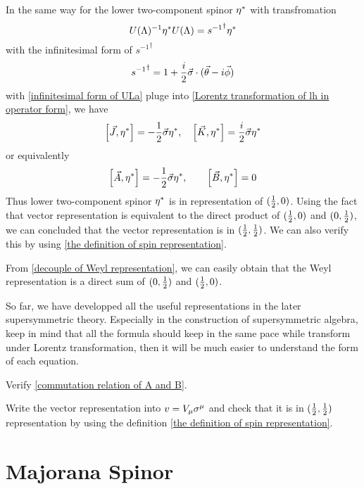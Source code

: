 In the same way for the lower two-component spinor ${\eta^*}$ with transfromation
\begin{equation} \label{Lorentz transformation of lh in operator form}
U(\Lambda)^{-1}{\eta^*} U(\Lambda) = {s^{-1}}^{\dagger} {\eta^*}
\end{equation}
with the infinitesimal form of ${s^{-1}}^{\dagger}$
\begin{equation}
  {s^{-1}}^{\dagger} = 1 + \frac{i}{2}\vec{\sigma}\cdot(\vec{\theta}-i\vec{\phi})
\end{equation}
with \eqref{infinitesimal form of ULa} pluge into \eqref{Lorentz transformation of lh in operator form}, we have
\begin{equation}
  \comm{\vec{J}}{\lh}=-\half\vec{\s}\lh,\quad
\comm{\vec{K}}{\lh} = \frac{i}{2}\vec{\s}\lh
\end{equation}
or equivalently
\begin{equation}
  \comm{\vec{A}}{\lh} = -\half \vec{\s}\lh,\qquad
\comm{\vec{B}}{\lh} =0
\end{equation}
Thus lower two-component spinor ${\eta^*}$ is in representation of $(\frac{1}{2},0)$.
Using the fact that vector representation is equivalent to the direct product of $(\frac{1}{2},0)$ and $(0,\frac{1}{2})$, we can concluded that the vector representation is in $(\frac{1}{2},\frac{1}{2})$. We can also verify this by using \eqref{the definition of spin representation}.

From \eqref{decouple of Weyl representation}, we can easily obtain that the Weyl representation is a direct sum of $(0,\frac{1}{2})$ and $(\frac{1}{2},0)$. 

So far, we have developped all the useful representations in the later supersymmetric theory. Especially in the construction of supersymmetric algebra, keep in mind that all the formula should keep in the same pace while transform under Lorentz transformation, then it will be much easier to understand the form of each equation.

\begin{Exe}
Verify \eqref{commutation relation of A and B}.
\end{Exe}

\begin{Exe}
Write the vector representation into $v=V_{\mu} \sigma^{\mu}$ and check that it is in $(\frac{1}{2},\frac{1}{2})$ representation by using the definition \eqref{the definition of spin representation}.
\end{Exe}

\section{Majorana Spinor}

